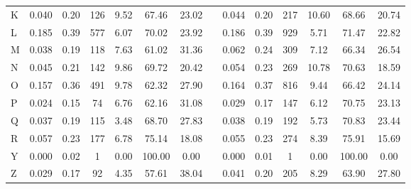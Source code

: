 \begin{tabular}{lccccccccccccc}
\hspace{3mm}K & 0.040 & 0.20 &  126 &    9.52 &  67.46 &        23.02 &                       & 0.044 & 0.20 &  217 &   10.60 &  68.66 &        20.74 \\
\hspace{3mm}L & 0.185 & 0.39 &  577 &    6.07 &  70.02 &        23.92 &                       & 0.186 & 0.39 &  929 &    5.71 &  71.47 &        22.82 \\
\hspace{3mm}M & 0.038 & 0.19 &  118 &    7.63 &  61.02 &        31.36 &                       & 0.062 & 0.24 &  309 &    7.12 &  66.34 &        26.54 \\
\hspace{3mm}N & 0.045 & 0.21 &  142 &    9.86 &  69.72 &        20.42 &                       & 0.054 & 0.23 &  269 &   10.78 &  70.63 &        18.59 \\
\hspace{3mm}O & 0.157 & 0.36 &  491 &    9.78 &  62.32 &        27.90 &                       & 0.164 & 0.37 &  816 &    9.44 &  66.42 &        24.14 \\
\hspace{3mm}P & 0.024 & 0.15 &   74 &    6.76 &  62.16 &        31.08 &                       & 0.029 & 0.17 &  147 &    6.12 &  70.75 &        23.13 \\
\hspace{3mm}Q & 0.037 & 0.19 &  115 &    3.48 &  68.70 &        27.83 &                       & 0.038 & 0.19 &  192 &    5.73 &  70.83 &        23.44 \\
\hspace{3mm}R & 0.057 & 0.23 &  177 &    6.78 &  75.14 &        18.08 &                       & 0.055 & 0.23 &  274 &    8.39 &  75.91 &        15.69 \\
\hspace{3mm}Y & 0.000 & 0.02 &    1 &    0.00 & 100.00 &         0.00 &                       & 0.000 & 0.01 &    1 &    0.00 & 100.00 &         0.00 \\
\hspace{3mm}Z & 0.029 & 0.17 &   92 &    4.35 &  57.61 &        38.04 &                       & 0.041 & 0.20 &  205 &    8.29 &  63.90 &        27.80 \\
\bottomrule
\end{tabular}
